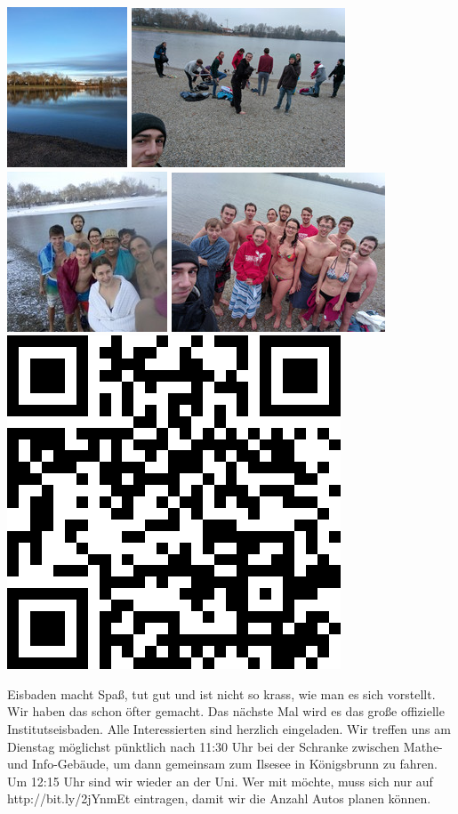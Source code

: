 \documentclass[a4paper,ngerman,landscape]{scrartcl}
\begin{document}
\begin{center}
  \includegraphics[height=0.15\textwidth]{eisbaden-4}
  \includegraphics[height=0.15\textwidth]{eisbaden-3}
  \includegraphics[height=0.15\textwidth]{eisbaden-1}
  \includegraphics[height=0.15\textwidth]{eisbaden-2}
  \includegraphics[height=0.15\textwidth]{eisbaden-qrcode}

  \Huge

  \large
  \begin{minipage}{0.92\textwidth}
    \renewcommand{\baselinestretch}{1.3}

    \setlength\parskip{\medskipamount}
    \vspace{0.3em}
    Eisbaden macht Spaß, tut gut und ist nicht so krass, wie man es sich vorstellt.
    Wir haben das schon öfter gemacht. Das nächste Mal wird es das große
    offizielle Institutseisbaden. Alle Interessierten sind herzlich eingeladen.
    Wir treffen uns am Dienstag möglichst pünktlich nach 11:30 Uhr bei der
    Schranke zwischen Mathe- und Info-Gebäude, um dann gemeinsam zum Ilsesee in
    Königsbrunn zu fahren. Um 12:15 Uhr sind wir wieder an der Uni.
    Wer mit möchte, muss sich nur auf \textsf{http:/$\!$/bit.ly/2jYnmEt} eintragen, damit
    wir die Anzahl Autos planen können.
    \vspace{0.3em}
  \end{minipage}


\end{center}
\end{document}
